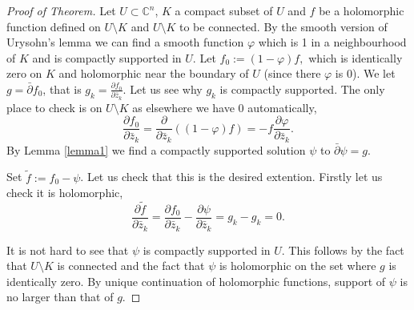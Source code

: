 \documentclass[12pt]{article}
\theoremstyle{theorem}
\theoremstyle{definition}
\theoremstyle{remark}
\begin{document}
\begin{proof}[Proof of Theorem]
Let $U \subset {\mathbb C}^n$, $K$ a compact subset of $U$ and $f$ be a
holomorphic function defined on $U \setminus K$ and $U \setminus K$ to
be connected.
By the smooth version of Urysohn's lemma we can
find a smooth function $\varphi$ which is 1 in a neighbourhood of
$K$ and is compactly supported in $U.$  Let
$f_0 := (1-\varphi)f,$ which is identically zero on $K$ and holomorphic
near the boundary of $U$ (since there $\varphi$ is 0).
We let $g = \bar{\partial} f_0$, that is $g_k = \frac{\partial
f_0}{\partial \bar{z}_k}$.  Let us see why $g_k$ is compactly supported.  The
only place to check is on $U \setminus K$ as elsewhere we have 0
automatically,
\begin{equation*}
\frac{\partial f_0}{\partial \bar{z}_k}
=
\frac{\partial }{\partial \bar{z}_k}
((1-\varphi)f)
=
- f \frac{\partial \varphi}{\partial \bar{z}_k} .
\end{equation*}
By Lemma \ref{lemma1} we find a compactly supported solution $\psi$
to $\bar{\partial}\psi = g$.

Set $\tilde{f} := f_0 - \psi$.  Let us check that this is the desired
extention.  Firstly let us check it is holomorphic,
\begin{equation*}
\frac{\partial \tilde{f}}{\partial \bar{z}_k}
=
\frac{\partial f_0}{\partial \bar{z}_k}
-
\frac{\partial \psi}{\partial \bar{z}_k}
=
g_k
-
g_k
= 0 .
\end{equation*}

It is not hard to see that $\psi$ is compactly supported in $U.$  This follows
by the fact that $U \setminus K$ is connected and the fact
that $\psi$
is holomorphic on the set where $g$ is identically zero.  By unique continuation
of holomorphic functions, support of $\psi$ is no larger than that of $g.$
\end{proof}

\end{document}
